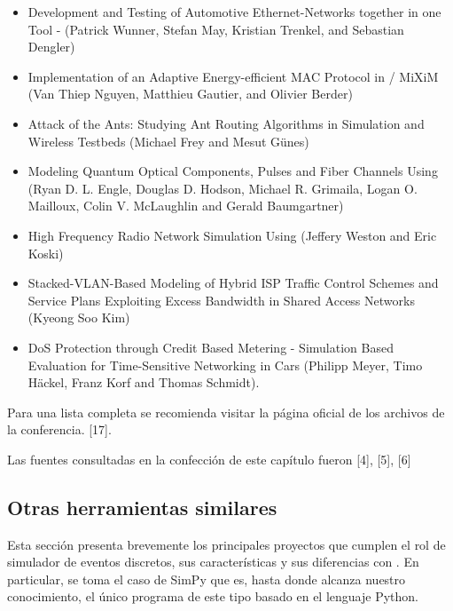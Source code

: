 \documentclass[]{article}
\begin{document}
\begin{itemize}
    \item Development and Testing of Automotive Ethernet-Networks together in
one Tool - \omnetpp{} (Patrick Wunner, Stefan May, Kristian Trenkel, and
Sebastian Dengler)

    \item Implementation of an Adaptive Energy-efficient MAC Protocol in
\omnetpp{} / MiXiM (Van Thiep Nguyen, Matthieu Gautier, and Olivier Berder)

    \item Attack of the Ants: Studying Ant Routing Algorithms in Simulation and
Wireless Testbeds (Michael Frey and Mesut Günes)

    \item Modeling Quantum Optical Components, Pulses and Fiber Channels Using
\omnetpp{} (Ryan D. L. Engle, Douglas D. Hodson, Michael R. Grimaila, Logan O.
Mailloux, Colin V. McLaughlin and Gerald Baumgartner)

    \item High Frequency Radio Network Simulation Using \omnetpp{} (Jeffery
Weston and Eric Koski)

    \item Stacked-VLAN-Based Modeling of Hybrid ISP Traffic Control Schemes and
Service Plans Exploiting Excess Bandwidth in Shared Access Networks (Kyeong Soo
Kim)

    \item DoS Protection through Credit Based Metering - Simulation Based
Evaluation for Time-Sensitive Networking in Cars (Philipp Meyer, Timo Häckel,
Franz Korf and Thomas Schmidt).
\end{itemize}

Para una lista completa se recomienda visitar la página oficial de los archivos
de la conferencia. [17].

Las fuentes consultadas en la confección de este capítulo fueron [4], [5], [6]

\subsection{Otras herramientas similares}

Esta sección presenta brevemente los principales proyectos que cumplen el rol
de simulador de eventos discretos, sus características y sus diferencias con
\omnetpp{}. En particular, se toma el caso de SimPy que es, hasta donde alcanza
nuestro conocimiento, el único programa de este tipo basado en el lenguaje
Python.
\end{document}
